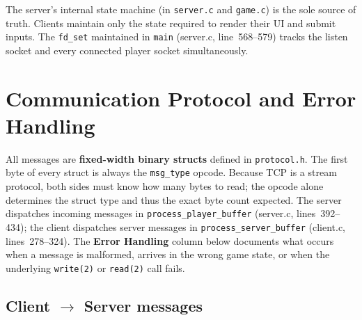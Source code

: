 \documentclass[11pt,letterpaper]{article}
\begin{document}
\begin{center}
\end{center}

The server's internal state machine (in \texttt{server.c} and \texttt{game.c}) is the sole source of truth. Clients maintain only the state required to render their UI and submit inputs. The \texttt{fd\_set} maintained in \texttt{main} (server.c, line~568--579) tracks the listen socket and every connected player socket simultaneously.

\section{Communication Protocol and Error Handling}

All messages are \textbf{fixed-width binary structs} defined in \texttt{protocol.h}. The first byte of every struct is always the \texttt{msg\_type} opcode. Because TCP is a stream protocol, both sides must know how many bytes to read; the opcode alone determines the struct type and thus the exact byte count expected. The server dispatches incoming messages in \texttt{process\_player\_buffer} (server.c, lines~392--434); the client dispatches server messages in \texttt{process\_server\_buffer} (client.c, lines~278--324). The \textbf{Error Handling} column below documents what occurs when a message is malformed, arrives in the wrong game state, or when the underlying \texttt{write(2)} or \texttt{read(2)} call fails.

\subsection*{Client $\to$ Server messages}
\end{document}

